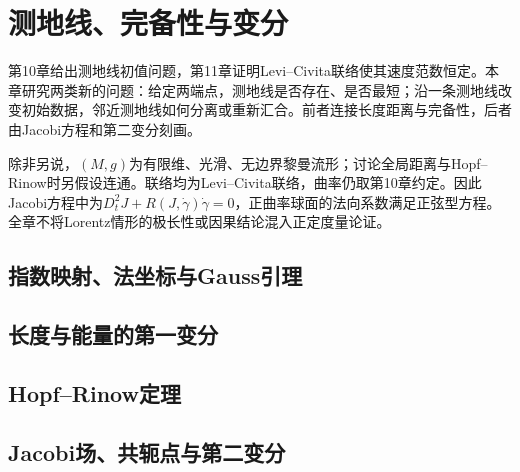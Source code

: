 \chapter{测地线、完备性与变分}
\label{ch:12-geodesics}

第10章给出测地线初值问题，第11章证明Levi--Civita联络使其速度范数恒定。本章研究两类新的问题：给定两端点，测地线是否存在、是否最短；沿一条测地线改变初始数据，邻近测地线如何分离或重新汇合。前者连接长度距离与完备性，后者由Jacobi方程和第二变分刻画。

除非另说，$(M,g)$为有限维、光滑、无边界黎曼流形；讨论全局距离与Hopf--Rinow时另假设连通。联络均为Levi--Civita联络，曲率仍取第10章约定。因此Jacobi方程中为$D_t^2J+R(J,\dot\gamma)\dot\gamma=0$，正曲率球面的法向系数满足正弦型方程。全章不将Lorentz情形的极长性或因果结论混入正定度量论证。

\section{指数映射、法坐标与Gauss引理}


\section{长度与能量的第一变分}


\section{Hopf--Rinow定理}


\section{Jacobi场、共轭点与第二变分}



